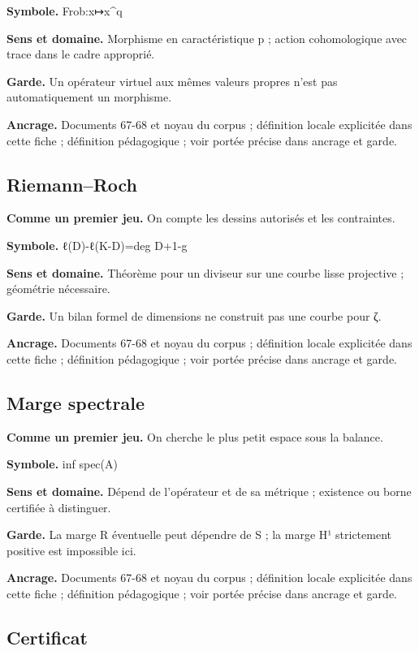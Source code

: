\documentclass[
  9pt,
  a4paper,
]{article}
\begin{document}
\textbf{Symbole.} Frob:x↦x\^{}q

\textbf{Sens et domaine.} Morphisme en caractéristique p ; action
cohomologique avec trace dans le cadre approprié.

\textbf{Garde.} Un opérateur virtuel aux mêmes valeurs propres n'est pas
automatiquement un morphisme.

\textbf{Ancrage.} Documents 67-68 et noyau du corpus ; définition locale
explicitée dans cette fiche ; définition pédagogique ; voir portée
précise dans ancrage et garde.

\hypertarget{riemannroch}{%
\subsection{Riemann--Roch}\label{riemannroch}}

\textbf{Comme un premier jeu.} On compte les dessins autorisés et les
contraintes.

\textbf{Symbole.} ℓ(D)-ℓ(K-D)=deg D+1-g

\textbf{Sens et domaine.} Théorème pour un diviseur sur une courbe lisse
projective ; géométrie nécessaire.

\textbf{Garde.} Un bilan formel de dimensions ne construit pas une
courbe pour ζ.

\textbf{Ancrage.} Documents 67-68 et noyau du corpus ; définition locale
explicitée dans cette fiche ; définition pédagogique ; voir portée
précise dans ancrage et garde.

\hypertarget{marge-spectrale}{%
\subsection{Marge spectrale}\label{marge-spectrale}}

\textbf{Comme un premier jeu.} On cherche le plus petit espace sous la
balance.

\textbf{Symbole.} inf spec(A)

\textbf{Sens et domaine.} Dépend de l'opérateur et de sa métrique ;
existence ou borne certifiée à distinguer.

\textbf{Garde.} La marge R éventuelle peut dépendre de S ; la marge H¹
strictement positive est impossible ici.

\textbf{Ancrage.} Documents 67-68 et noyau du corpus ; définition locale
explicitée dans cette fiche ; définition pédagogique ; voir portée
précise dans ancrage et garde.

\hypertarget{certificat}{%
\subsection{Certificat}\label{certificat}}
\end{document}
